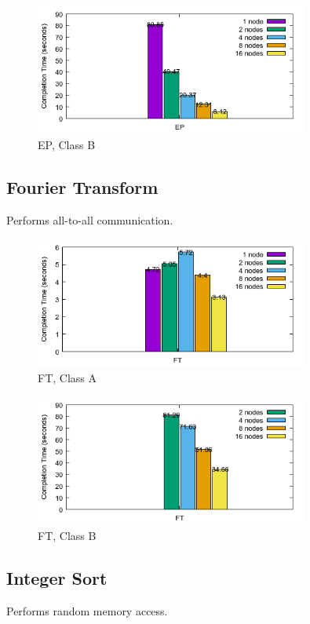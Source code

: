 \documentclass[a4paper]{article}
\begin{document}
\begin{figure}[H]
\centering
\includegraphics[width=0.8\textwidth]{figures/EPvB.png}
\caption{\label{fig:EPvB}EP, Class B}
\end{figure}


\subsection{Fourier Transform}
Performs all-to-all communication.


\begin{figure}[H]
\centering
\includegraphics[width=0.8\textwidth]{figures/FTvA.png}
\caption{\label{fig:FTvA}FT, Class A}
\end{figure}

\begin{figure}[H]
\centering
\includegraphics[width=0.8\textwidth]{figures/FTvB.png}
\caption{\label{fig:FTvB}FT, Class B}
\end{figure}

\subsection{Integer Sort}
Performs random memory access.
\end{document}
